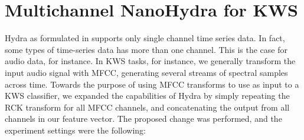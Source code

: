 \section{Multichannel NanoHydra for KWS}\label{sec:rs_speechcomms}
Hydra as formulated in \cite{Dempster2023Hydra} supports only single channel time series data.
In fact, some types of time-series data has more than one channel. This is the case for audio data, for instance.
In KWS tasks, for instance, we generally transform the input audio signal with MFCC, generating several streams of spectral samples across time.
Towards the purpose of using MFCC transforms to use as input to a KWS classifier, we expanded the capabilities of Hydra by simply
repeating the RCK transform for all MFCC channels, and concatenating the output from all channels in our feature vector.
The proposed change was performed, and the experiment settings were the following:

